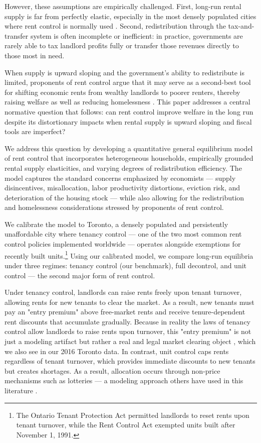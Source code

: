 \documentclass[parskip=full]{article}
\begin{document}
However, these assumptions are empirically challenged. First, long-run rental supply is far from perfectly elastic, especially in the most densely populated cities where rent control is normally used \citep{orr-1968,cy-1994,susin-2002,fack-2006,sy-2020,rs-2023}. Second, redistribution through the tax-and-transfer system is often incomplete or inefficient: in practice, governments are rarely able to tax landlord profits fully or transfer those revenues directly to those most in need.

When supply is upward sloping and the government's ability to redistribute is limited, proponents of rent control argue that it may serve as a second-best tool for shifting economic rents from wealthy landlords to poorer renters, thereby raising welfare as well as reducing homelessness \citep{gyourko1989,arnott-1995}. This paper addresses a central normative question that follows: can rent control improve welfare in the long run despite its distortionary impacts when rental supply is upward sloping and fiscal tools are imperfect?

We address this question by developing a quantitative general equilibrium model of rent control that incorporates heterogeneous households, empirically grounded rental supply elasticities, and varying degrees of redistribution efficiency. The model captures the standard concerns emphasized by economists — supply disincentives, misallocation, labor productivity distortions, eviction risk, and deterioration of the housing stock — while also allowing for the redistribution and homelessness considerations stressed by proponents of rent control.

We calibrate the model to Toronto, a densely populated and persistently unaffordable city where tenancy control — one of the two most common rent control policies implemented worldwide — operates alongside exemptions for recently built units.\footnote{The Ontario Tenant Protection Act permitted landlords to reset rents upon tenant turnover, while the Rent Control Act exempted units built after November 1, 1991.} Using our calibrated model, we compare long-run equilibria under three regimes: tenancy control (our benchmark), full decontrol, and unit control — the second major form of rent control. 

Under tenancy control, landlords can raise rents freely upon tenant turnover, allowing rents for new tenants to clear the market. As a result, new tenants must pay an "entry premium" above free-market rents and receive tenure-dependent rent discounts that accumulate gradually. Because in reality the laws of tenancy control allow landlords to raise rents upon turnover, this "entry premium" is not just a modeling artifact but rather a real and legal market clearing object \citep{arnott-1995}, which we also see in our 2016 Toronto data. In contrast, unit control caps rents regardless of tenant turnover, which provides immediate discounts to new tenants but creates shortages. As a result, allocation occurs through non-price mechanisms such as lotteries — a modeling approach others have used in this literature \citep{fmn-2023}.
\end{document}
